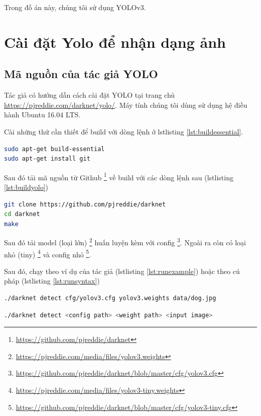 Trong đồ án này, chúng tôi sử dụng YOLOv3.

\section{Cài đặt Yolo để nhận dạng ảnh}

\subsection{Mã nguồn của tác giả YOLO}

Tác giả có hướng dẫn cách cài đặt YOLO \cite{yolov3} tại trang chủ  \url{https://pjreddie.com/darknet/yolo/}. Máy tính chúng tôi dùng sử dụng hệ điều hành Ubuntu 16.04 LTS. 

Cài những thứ cần thiết để build với dòng lệnh ở lstlisting \ref{lst:buildessential}.

\begin{lstlisting}[caption={Cài những gói cần thiết để build}, label={lst:buildessential}, language=bash]
sudo apt-get build-essential
sudo apt-get install git
\end{lstlisting}

Sau đó tải mã nguồn từ Github \footnote{\url{https://github.com/pjreddie/darknet}} về build với các dòng lệnh sau (lstlisting \ref{lst:buildyolo})


\begin{lstlisting}[caption={Tải và build mã nguồn}, label={lst:buildyolo}, language=bash]
git clone https://github.com/pjreddie/darknet   
cd darknet 
make  
\end{lstlisting}

Sau đó tải model (loại lớn) \footnote{\url{https://pjreddie.com/media/files/yolov3.weights}}  huấn luyện kèm với config \footnote{\url{https://github.com/pjreddie/darknet/blob/master/cfg/yolov3.cfg}}. Ngoài ra còn có loại nhỏ (tiny) \footnote{\url{https://pjreddie.com/media/files/yolov3-tiny.weights}} và config nhỏ \footnote{\url{https://github.com/pjreddie/darknet/blob/master/cfg/yolov3-tiny.cfg}}. 

Sau đó, chạy theo ví dụ của tác giả (lstlisting \ref{lst:runexample}) hoặc theo cú pháp (lstlisting \ref{lst:runsyntax})

\begin{lstlisting}[caption={ví dụ chạy nhận diện vật thể}, label={lst:runexample}, language=bash]
./darknet detect cfg/yolov3.cfg yolov3.weights data/dog.jpg
\end{lstlisting}


\begin{lstlisting}[caption={cú pháp chạy nhận diện vật thể}, label={lst:runsyntax}, language=bash]
./darknet detect <config path> <weight path> <input image>
\end{lstlisting}


